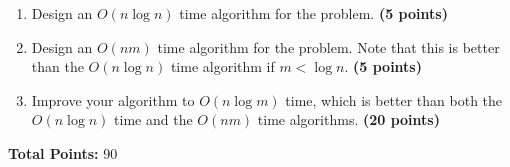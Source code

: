 \documentclass[11pt]{article}
\begin{document}
\begin{enumerate}
\begin{enumerate}
\item
Design an $O(n\log n)$ time algorithm for the problem. {\hfill \bf (5 points)}
\item
Design an $O(nm)$ time algorithm for the problem. Note that this is better than the $O(n\log n)$ time algorithm if $m<\log n$. {\hfill \bf (5 points)}

\item
Improve your algorithm to $O(n\log m)$ time, which is better than both the $O(n\log n)$ time and the $O(nm)$ time algorithms. {\hfill \bf (20 points)}

\end{enumerate}


\end{enumerate}


{\bf Total Points:} 90
\end{document}
